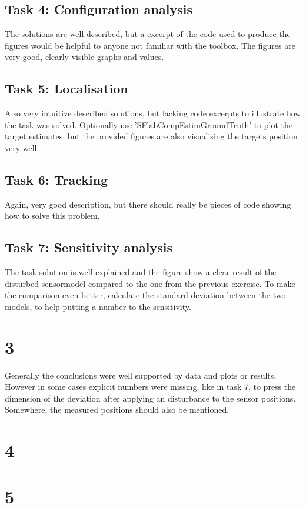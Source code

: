 \documentclass[10pt,a4paper]{report}
\begin{document}
\subsection*{Task 4: Configuration analysis}
The solutions are well described, but a excerpt of the code used to produce the figures would be helpful to anyone not familiar with the toolbox. The figures are very good, clearly visible graphs and values.



\subsection*{Task 5: Localisation}
Also very intuitive described solutions, but lacking code excerpts to illustrate how the task was solved. Optionally use 'SFlabCompEstimGroundTruth' to plot the target estimates, but the provided figures are also visualising the targets position very well.



\subsection*{Task 6: Tracking}
Again, very good description, but there should really be pieces of code showing how to solve this problem.



\subsection*{Task 7: Sensitivity analysis}
The task solution is well explained and the figure show a clear result of the disturbed sensormodel compared to the one from the previous exercise. To make the comparison even better, calculate the standard deviation between the two models, to help putting a number to the sensitivity. 



\section*{3}
Generally the conclusions were well supported by data and plots or results. However in some cases explicit numbers were missing, like in task 7, to press the dimension of the deviation after applying an disturbance to the sensor positions. Somewhere, the measured positions should also be mentioned.



\section*{4}



\section*{5}
\end{document}
